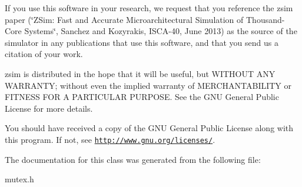 If you use this software in your research, we request that you reference the zsim paper (\char`\"{}\-Z\-Sim\-: Fast and Accurate Microarchitectural Simulation of
\-Thousand-\/\-Core Systems\char`\"{}, Sanchez and Kozyrakis, I\-S\-C\-A-\/40, June 2013) as the source of the simulator in any publications that use this software, and that you send us a citation of your work.

zsim is distributed in the hope that it will be useful, but W\-I\-T\-H\-O\-U\-T A\-N\-Y W\-A\-R\-R\-A\-N\-T\-Y; without even the implied warranty of M\-E\-R\-C\-H\-A\-N\-T\-A\-B\-I\-L\-I\-T\-Y or F\-I\-T\-N\-E\-S\-S F\-O\-R A P\-A\-R\-T\-I\-C\-U\-L\-A\-R P\-U\-R\-P\-O\-S\-E. See the G\-N\-U General Public License for more details.

You should have received a copy of the G\-N\-U General Public License along with this program. If not, see \href{http://www.gnu.org/licenses/}{\tt http\-://www.\-gnu.\-org/licenses/}. 

The documentation for this class was generated from the following file\-:\begin{DoxyCompactItemize}
\item 
mutex.\-h\end{DoxyCompactItemize}
